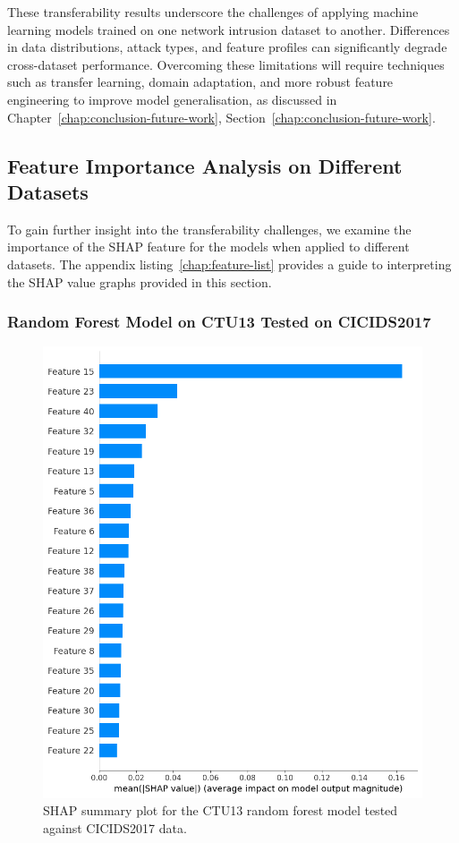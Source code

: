 These transferability results underscore the challenges of applying machine learning models trained on one network intrusion dataset to another. Differences in data distributions, attack types, and feature profiles can significantly degrade cross-dataset performance. Overcoming these limitations will require techniques such as transfer learning, domain adaptation, and more robust feature engineering to improve model generalisation, as discussed in Chapter~\ref{chap:conclusion-future-work}, Section~\ref{chap:conclusion-future-work}.

\subsection{Feature Importance Analysis on Different Datasets}\label{subsec:feature-importance-analysis-different-datasets}

To gain further insight into the transferability challenges, we examine the importance of the SHAP feature for the models when applied to different datasets. The appendix listing~\ref{chap:feature-list} provides a guide to interpreting the SHAP value graphs provided in this section.

\subsubsection{Random Forest Model on CTU13 Tested on CICIDS2017}\label{subsec:rf-ctu13-cicids2017}

\begin{figure}[H]
\centering
\includegraphics[width=\textwidth]{img/SHAP_RFCTU13_CICIDS2017.png}
\caption{SHAP summary plot for the CTU13 random forest model tested against CICIDS2017 data.}\label{fig:shap_rfc_ctu13_cicids2017}
\end{figure}

